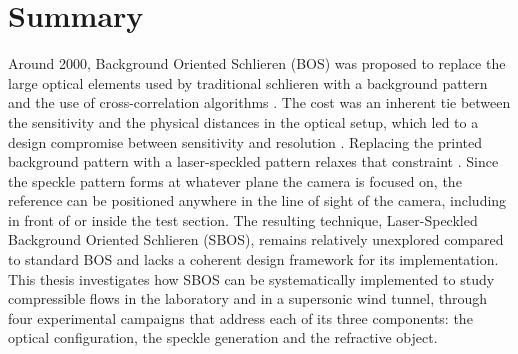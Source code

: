 \chapter*{Summary}

Around 2000, Background Oriented Schlieren (BOS) was proposed to replace the large optical elements used by traditional schlieren with a background pattern and the use of cross-correlation algorithms \cite{Dalziel2000, Raffel2001}. The cost was an inherent tie between the sensitivity and the physical distances in the optical setup, which led to a design compromise between sensitivity and resolution \cite{Raffel2015, Schmidt2025}. Replacing the printed background pattern with a laser-speckled pattern relaxes that constraint \cite{Meier&Roesgen2013}. Since the speckle pattern forms at whatever plane the camera is focused on, the reference can be positioned anywhere in the line of sight of the camera, including in front of or inside the test section. The resulting technique, Laser-Speckled Background Oriented Schlieren (SBOS), remains relatively unexplored compared to standard BOS and lacks a coherent design framework for its implementation. This thesis investigates how SBOS can be systematically implemented to study compressible flows in the laboratory and in a supersonic wind tunnel, through four experimental campaigns that address each of its three components: the optical configuration, the speckle generation and the refractive object.

